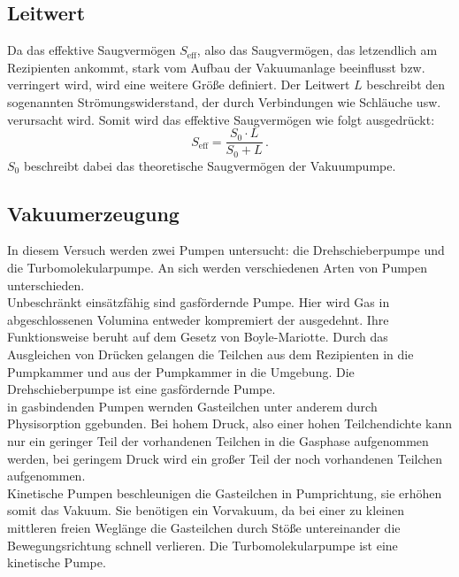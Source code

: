         \subsection{Leitwert}
            Da das effektive Saugvermögen $S_\text{eff}$, also das Saugvermögen, das letzendlich am Rezipienten ankommt, stark vom Aufbau der Vakuumanlage beeinflusst bzw. verringert wird, wird eine weitere Größe definiert.
            Der Leitwert $L$ beschreibt den sogenannten Strömungswiderstand, der durch Verbindungen wie Schläuche usw. verursacht wird.
            Somit wird das effektive Saugvermögen wie folgt ausgedrückt:
            \begin{equation*}
                S_\text{eff} = \frac{S_0 \cdot L}{S_0 + L} \, .
            \end{equation*}
            $S_0$ beschreibt dabei das theoretische Saugvermögen der Vakuumpumpe.


    \subsection{Vakuumerzeugung}
        In diesem Versuch werden zwei Pumpen untersucht: die Drehschieberpumpe und die Turbomolekularpumpe. An sich werden verschiedenen Arten von Pumpen unterschieden. \\
        Unbeschränkt einsätzfähig sind gasfördernde Pumpe. Hier wird Gas in abgeschlossenen Volumina entweder kompremiert der ausgedehnt. Ihre Funktionsweise beruht auf dem Gesetz von 
        Boyle-Mariotte. Durch das Ausgleichen von Drücken gelangen die Teilchen aus dem Rezipienten in die Pumpkammer und aus der Pumpkammer in die Umgebung. Die Drehschieberpumpe ist eine 
        gasfördernde Pumpe. \\
        in gasbindenden Pumpen wernden Gasteilchen unter anderem durch Physisorption ggebunden. Bei hohem Druck, also einer hohen Teilchendichte kann nur ein geringer Teil der vorhandenen 
        Teilchen in die Gasphase aufgenommen werden, bei geringem Druck wird ein großer Teil der noch vorhandenen Teilchen aufgenommen. \\
        Kinetische Pumpen beschleunigen die Gasteilchen in Pumprichtung, sie erhöhen somit das Vakuum. 
        Sie benötigen ein Vorvakuum, da bei einer zu kleinen mittleren freien Weglänge die Gasteilchen durch Stöße untereinander die Bewegungsrichtung schnell verlieren. 
        Die Turbomolekularpumpe ist eine kinetische Pumpe.


